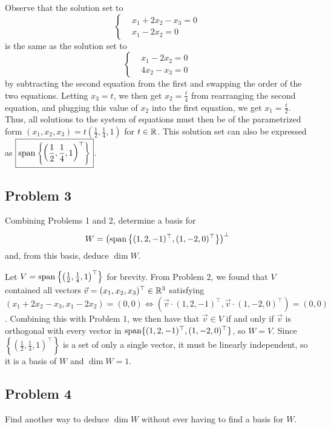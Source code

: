 \documentclass[main.tex]{subfiles}
\begin{document}
\begin{soln}
    Observe that the solution set to
    \[\left\{\begin{aligned}
    &x_1 + 2x_2 - x_3 = 0 \\
    &x_1 - 2x_2 = 0
    \end{aligned}\right.\]
    is the same as the solution set to
    \[\left\{\begin{aligned}
    &x_1 - 2x_2 = 0 \\
    &4x_2 - x_3 = 0
    \end{aligned}\right.\]
    by subtracting the second equation from the first and swapping the order of the two equations. Letting $x_3 = t$, we then get $x_2 = \frac{t}{4}$ from rearranging the second equation, and plugging this value of $x_2$ into the first equation, we get $x_1 = \frac{t}{2}$. Thus, all solutions to the system of equations must then be of the parametrized form $(x_1, x_2, x_3) = t\left(\frac{1}{2}, \frac{1}{4}, 1\right)$ for $t\in \mathbb R$. This solution set can also be expressed as $\boxed{\operatorname{span}\left\{\left(\frac{1}{2}, \frac{1}{4}, 1\right)^\top\right\}}$.
\end{soln}
\eject

\subsection{Problem 3}
\begin{claim}
    Combining Problems 1 and 2, determine a basis for
    \[W = \left( \operatorname{span}\left\{ (1, 2, -1)^\top , (1, -2, 0)^\top  \right\} \right)^\perp\]
    and, from this basis, deduce $\dim W$.
\end{claim}

\begin{soln}
    Let $V = \operatorname{span}\left\{\left(\frac{1}{2}, \frac{1}{4}, 1\right)^\top\right\}$ for brevity. From Problem 2, we found that $V$ contained all vectors $\vec{v} = (x_1, x_2, x_3)^\top\in \mathbb R^3$ satisfying $(x_1 + 2x_2 - x_3, x_1 - 2x_2) = (0, 0)\iff (\vec{v}\cdot (1, 2, -1)^\top, \vec{v}\cdot (1, -2, 0)^\top) = (0, 0)$. Combining this with Problem 1, we then have that $\vec{v}\in V$ if and only if $\vec{v}$ is orthogonal with every vector in $\operatorname{span}\{(1, 2, -1)^\top, (1, -2, 0)^\top\}$, so $W = V$. Since $\left\{\left(\frac{1}{2}, \frac{1}{4}, 1\right)^\top\right\}$ is a set of only a single vector, it must be linearly independent, so it is a basis of $W$ and $\dim W = 1$.
\end{soln}
\eject

\subsection{Problem 4}
\begin{claim}
    Find another way to deduce $\dim W$ without ever having to find a basis for $W$.
\end{claim}
\end{document}
